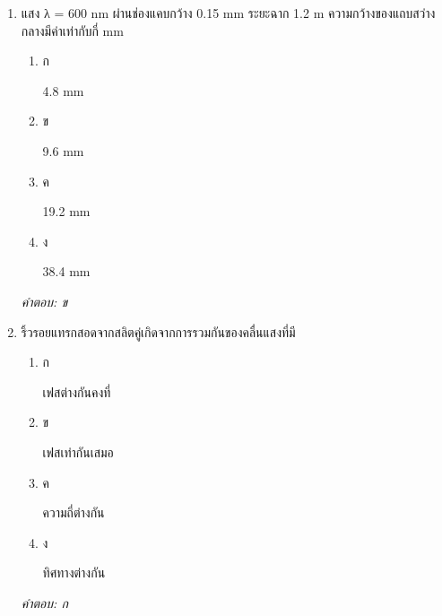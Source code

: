 \documentclass[12pt]{article}
\begin{document}
\begin{enumerate}[label=\arabic*., itemsep=0.5\baselineskip, topsep=0.5\baselineskip, leftmargin=*]
\item แสง λ = 600 nm ผ่านช่องแคบกว้าง 0.15 mm ระยะฉาก 1.2 m ความกว้างของแถบสว่างกลางมีค่าเท่ากับกี่ mm
\begin{enumerate}[label=\alph*)., itemsep=0.3\baselineskip, topsep=0.3\baselineskip]
\item ก\ 
\begin{minipage}[t]{0.9\linewidth}
\raggedright 4.8 mm
\end{minipage}
\item ข\ 
\begin{minipage}[t]{0.9\linewidth}
\raggedright 9.6 mm
\end{minipage}
\item ค\ 
\begin{minipage}[t]{0.9\linewidth}
\raggedright 19.2 mm
\end{minipage}
\item ง\ 
\begin{minipage}[t]{0.9\linewidth}
\raggedright 38.4 mm
\end{minipage}
\end{enumerate}
\vspace{-0.3\baselineskip}
\begin{small}
\textit{คำตอบ: ข}
\end{small}

\item ริ้วรอยแทรกสอดจากสลิตคู่เกิดจากการรวมกันของคลื่นแสงที่มี
\begin{enumerate}[label=\alph*)., itemsep=0.3\baselineskip, topsep=0.3\baselineskip]
\item ก\ 
\begin{minipage}[t]{0.9\linewidth}
\raggedright เฟสต่างกันคงที่
\end{minipage}
\item ข\ 
\begin{minipage}[t]{0.9\linewidth}
\raggedright เฟสเท่ากันเสมอ
\end{minipage}
\item ค\ 
\begin{minipage}[t]{0.9\linewidth}
\raggedright ความถี่ต่างกัน
\end{minipage}
\item ง\ 
\begin{minipage}[t]{0.9\linewidth}
\raggedright ทิศทางต่างกัน
\end{minipage}
\end{enumerate}
\vspace{-0.3\baselineskip}
\begin{small}
\textit{คำตอบ: ก}
\end{small}


\end{enumerate}
\end{document}
